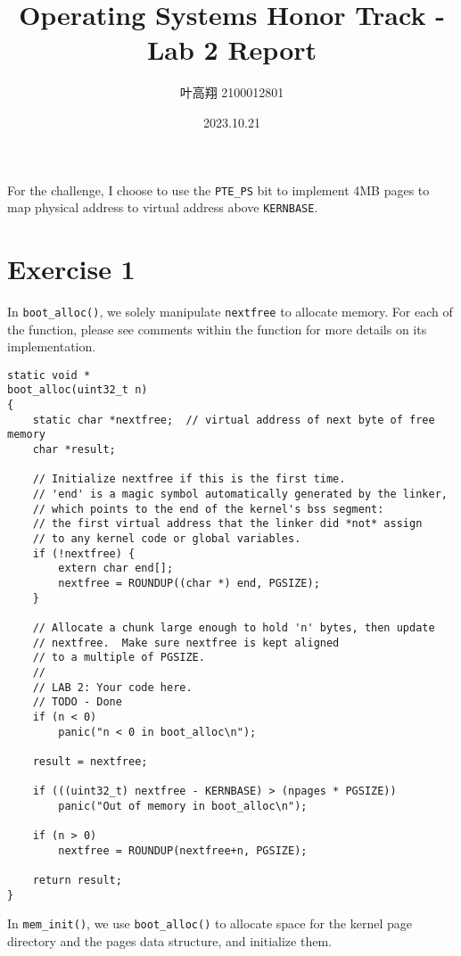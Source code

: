 \documentclass[]{article}
\title{Operating Systems Honor Track - Lab 2 Report}
\author{叶高翔 2100012801}
\date{2023.10.21}
\begin{document}
\maketitle

For the challenge, I choose to use the \verb|PTE_PS| bit to implement 4MB pages to map physical address to virtual address above \verb|KERNBASE|.

\section*{Exercise 1}

In \verb|boot_alloc()|, we solely manipulate \verb|nextfree| to allocate memory. For each of the function, please see comments within the function for more details on its implementation.

\begin{verbatim}
static void *
boot_alloc(uint32_t n)
{
	static char *nextfree;	// virtual address of next byte of free memory
	char *result;

	// Initialize nextfree if this is the first time.
	// 'end' is a magic symbol automatically generated by the linker,
	// which points to the end of the kernel's bss segment:
	// the first virtual address that the linker did *not* assign
	// to any kernel code or global variables.
	if (!nextfree) {
		extern char end[];
		nextfree = ROUNDUP((char *) end, PGSIZE);
	}

	// Allocate a chunk large enough to hold 'n' bytes, then update
	// nextfree.  Make sure nextfree is kept aligned
	// to a multiple of PGSIZE.
	//
	// LAB 2: Your code here.
	// TODO - Done
	if (n < 0)
		panic("n < 0 in boot_alloc\n");

	result = nextfree;

	if (((uint32_t) nextfree - KERNBASE) > (npages * PGSIZE))
		panic("Out of memory in boot_alloc\n");

	if (n > 0)
		nextfree = ROUNDUP(nextfree+n, PGSIZE);

	return result;
}
\end{verbatim}

In \verb|mem_init()|, we use \verb|boot_alloc()| to allocate space for the kernel page directory and the pages data structure, and initialize them.
\end{document}
